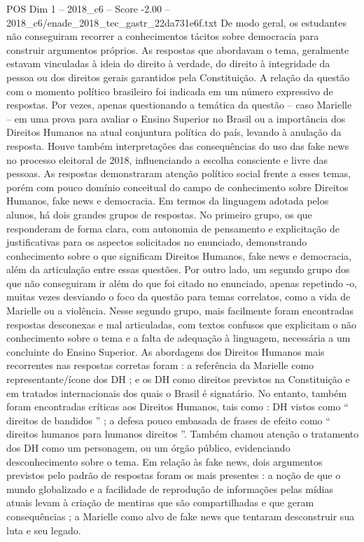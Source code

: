\begin{textsample}{POS Dim 1 – 2018\_c6 – Score -2.00 – 2018\_c6/enade\_2018\_tec\_gastr\_22da731e6f.txt}
De modo geral, os estudantes não conseguiram recorrer a conhecimentos tácitos sobre democracia para construir argumentos próprios.
As respostas que abordavam o tema, geralmente estavam vinculadas à ideia do direito à verdade, do direito à integridade da pessoa ou dos direitos gerais garantidos pela Constituição.
A relação da questão com o momento político brasileiro foi indicada em um número expressivo de respostas.
Por vezes, apenas questionando a temática da questão – caso Marielle – em uma prova para avaliar o Ensino Superior no Brasil ou a importância dos Direitos Humanos na atual conjuntura política do país, levando à anulação da resposta.
Houve também interpretações das consequências do uso das fake news no processo eleitoral de 2018, influenciando a escolha consciente e livre das pessoas.
As respostas demonstraram atenção político social frente a esses temas, porém com pouco domínio conceitual do campo de conhecimento sobre Direitos Humanos, fake news e democracia.
Em termos da linguagem adotada pelos alunos, há dois grandes grupos de respostas.
No primeiro grupo, os que responderam de forma clara, com autonomia de pensamento e explicitação de justificativas para os aspectos solicitados no enunciado, demonstrando conhecimento sobre o que significam Direitos Humanos, fake news e democracia, além da articulação entre essas questões.
Por outro lado, um segundo grupo dos que não conseguiram ir além do que foi citado no enunciado, apenas repetindo -o, muitas vezes desviando o foco da questão para temas correlatos, como a vida de Marielle ou a violência.
Nesse segundo grupo, mais facilmente foram encontradas respostas desconexas e mal articuladas, com textos confusos que explicitam o não conhecimento sobre o tema e a falta de adequação à linguagem, necessária a um concluinte do Ensino Superior.
As abordagens dos Direitos Humanos mais recorrentes nas respostas corretas foram : a referência da Marielle como representante/ícone dos DH ; e os DH como direitos previstos na Constituição e em tratados internacionais dos quais o Brasil é signatário.
No entanto, também foram encontradas críticas aos Direitos Humanos, tais como : DH vistos como “ direitos de bandidos ” ; a defesa pouco embasada de frases de efeito como “ direitos humanos para humanos direitos ”.
Também chamou atenção o tratamento dos DH como um personagem, ou um órgão público, evidenciando desconhecimento sobre o tema.
Em relação às fake news, dois argumentos previstos pelo padrão de respostas foram os mais presentes : a noção de que o mundo globalizado e a facilidade de reprodução de informações pelas mídias atuais levam à criação de mentiras que são compartilhadas e que geram consequências ; a Marielle como alvo de fake news que tentaram desconstruir sua luta e seu legado.

\end{textsample}
